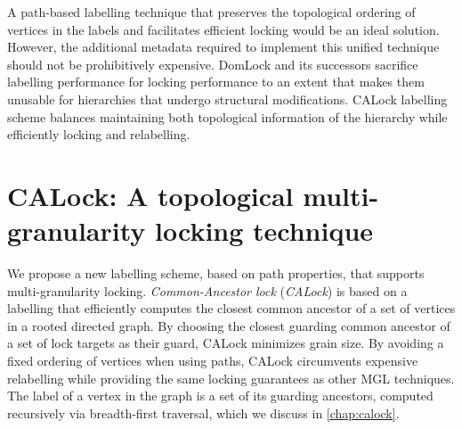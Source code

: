 A path-based labelling technique that preserves the topological ordering of vertices in the labels and facilitates efficient locking would be an ideal solution. However, the additional metadata required to implement this unified technique should not be prohibitively expensive. DomLock and its successors sacrifice labelling performance for locking performance to an extent that makes them unusable for hierarchies that undergo structural modifications. CALock labelling scheme balances maintaining both topological information of the hierarchy while efficiently locking and relabelling. 

\section{CALock: A topological multi-granularity locking technique}

We propose a new labelling scheme, based on path properties, that supports multi-granularity locking. {\em Common-Ancestor lock} ({\em CALock}) is based on a labelling that efficiently computes the closest common ancestor of a set of vertices in a rooted directed graph.
By choosing the closest guarding common ancestor of a set of lock targets as their guard, CALock minimizes grain size. By avoiding a fixed ordering of vertices when using paths, CALock circumvents expensive relabelling while providing the same locking guarantees as other MGL techniques. The label of a vertex in the graph is a set of its guarding ancestors, computed recursively via breadth-first traversal, which we discuss in \cref{chap:calock}.